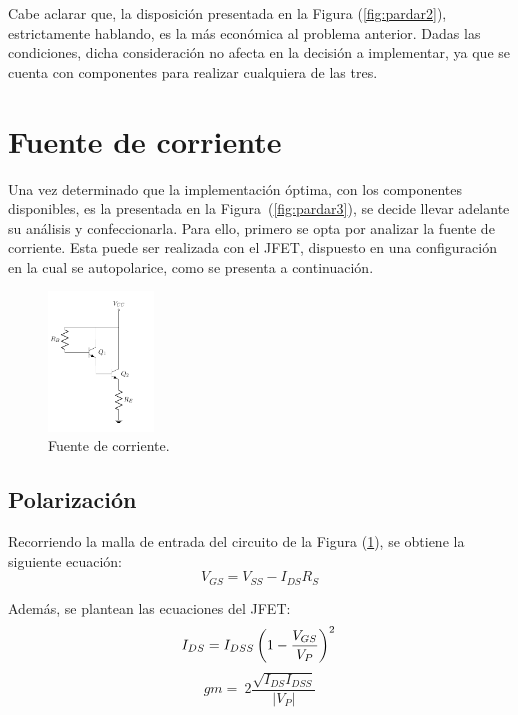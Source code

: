 Cabe aclarar que, la disposición presentada en la Figura (\ref{fig:pardar2}), estrictamente hablando, es la más económica al problema anterior. Dadas las condiciones, dicha consideración no afecta en la decisión a implementar, ya que se cuenta con componentes para realizar cualquiera de las tres.

\section{Fuente de corriente}
\label{sec:fdei}
Una vez determinado que la implementación óptima, con los componentes disponibles, es la presentada en la Figura~(\ref{fig:pardar3}), se decide llevar adelante su análisis y confeccionarla. Para ello, primero se opta por analizar la fuente de corriente. Esta puede ser realizada con el JFET, dispuesto en una configuración en la cual se autopolarice, como se presenta a continuación.
\begin{figure}[H]
\centering
	\includegraphics[width=0.25\textwidth, page=4]{Imagenes/ParDarlington.pdf}
	\caption{Fuente de corriente.}
	\label{fig:fuentei}
\end{figure}

\subsection{Polarización}
Recorriendo la malla de entrada del circuito de la Figura (\ref{fig:fuentei}), se obtiene la siguiente ecuación:
\begin{equation*}
	V_{GS} = V_{SS} - I_{DS} R_{S}
\end{equation*}

Además, se plantean las ecuaciones del JFET:
\begin{equation*}
	I_{DS} = I_{DSS} \left( 1 - \frac{V_{GS}}{V_P} \right)^2 \\
\end{equation*}
\begin{equation*}
	gm = \ 2\frac{\sqrt{I_{DS} I_{DSS}}}{|V_P|}
\end{equation*}

